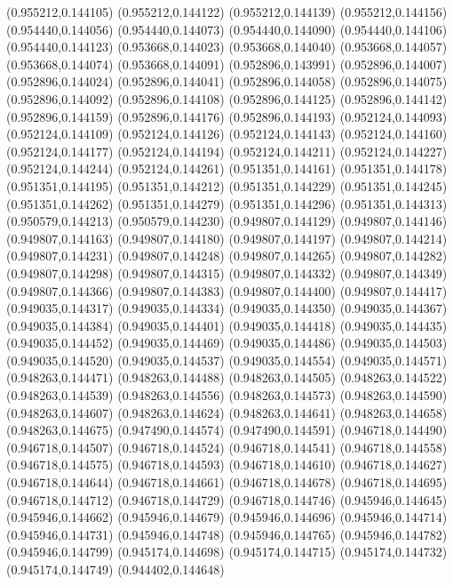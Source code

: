 (0.955212,0.144105)
(0.955212,0.144122)
(0.955212,0.144139)
(0.955212,0.144156)
(0.954440,0.144056)
(0.954440,0.144073)
(0.954440,0.144090)
(0.954440,0.144106)
(0.954440,0.144123)
(0.953668,0.144023)
(0.953668,0.144040)
(0.953668,0.144057)
(0.953668,0.144074)
(0.953668,0.144091)
(0.952896,0.143991)
(0.952896,0.144007)
(0.952896,0.144024)
(0.952896,0.144041)
(0.952896,0.144058)
(0.952896,0.144075)
(0.952896,0.144092)
(0.952896,0.144108)
(0.952896,0.144125)
(0.952896,0.144142)
(0.952896,0.144159)
(0.952896,0.144176)
(0.952896,0.144193)
(0.952124,0.144093)
(0.952124,0.144109)
(0.952124,0.144126)
(0.952124,0.144143)
(0.952124,0.144160)
(0.952124,0.144177)
(0.952124,0.144194)
(0.952124,0.144211)
(0.952124,0.144227)
(0.952124,0.144244)
(0.952124,0.144261)
(0.951351,0.144161)
(0.951351,0.144178)
(0.951351,0.144195)
(0.951351,0.144212)
(0.951351,0.144229)
(0.951351,0.144245)
(0.951351,0.144262)
(0.951351,0.144279)
(0.951351,0.144296)
(0.951351,0.144313)
(0.950579,0.144213)
(0.950579,0.144230)
(0.949807,0.144129)
(0.949807,0.144146)
(0.949807,0.144163)
(0.949807,0.144180)
(0.949807,0.144197)
(0.949807,0.144214)
(0.949807,0.144231)
(0.949807,0.144248)
(0.949807,0.144265)
(0.949807,0.144282)
(0.949807,0.144298)
(0.949807,0.144315)
(0.949807,0.144332)
(0.949807,0.144349)
(0.949807,0.144366)
(0.949807,0.144383)
(0.949807,0.144400)
(0.949807,0.144417)
(0.949035,0.144317)
(0.949035,0.144334)
(0.949035,0.144350)
(0.949035,0.144367)
(0.949035,0.144384)
(0.949035,0.144401)
(0.949035,0.144418)
(0.949035,0.144435)
(0.949035,0.144452)
(0.949035,0.144469)
(0.949035,0.144486)
(0.949035,0.144503)
(0.949035,0.144520)
(0.949035,0.144537)
(0.949035,0.144554)
(0.949035,0.144571)
(0.948263,0.144471)
(0.948263,0.144488)
(0.948263,0.144505)
(0.948263,0.144522)
(0.948263,0.144539)
(0.948263,0.144556)
(0.948263,0.144573)
(0.948263,0.144590)
(0.948263,0.144607)
(0.948263,0.144624)
(0.948263,0.144641)
(0.948263,0.144658)
(0.948263,0.144675)
(0.947490,0.144574)
(0.947490,0.144591)
(0.946718,0.144490)
(0.946718,0.144507)
(0.946718,0.144524)
(0.946718,0.144541)
(0.946718,0.144558)
(0.946718,0.144575)
(0.946718,0.144593)
(0.946718,0.144610)
(0.946718,0.144627)
(0.946718,0.144644)
(0.946718,0.144661)
(0.946718,0.144678)
(0.946718,0.144695)
(0.946718,0.144712)
(0.946718,0.144729)
(0.946718,0.144746)
(0.945946,0.144645)
(0.945946,0.144662)
(0.945946,0.144679)
(0.945946,0.144696)
(0.945946,0.144714)
(0.945946,0.144731)
(0.945946,0.144748)
(0.945946,0.144765)
(0.945946,0.144782)
(0.945946,0.144799)
(0.945174,0.144698)
(0.945174,0.144715)
(0.945174,0.144732)
(0.945174,0.144749)
(0.944402,0.144648)
